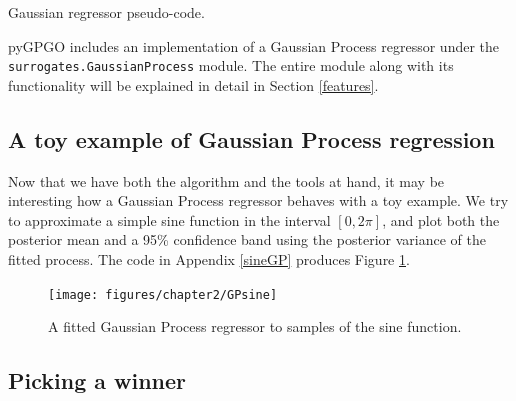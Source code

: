 \documentclass[10pt,a4paper,twoside]{book}
\begin{document}
\begin{algorithm}
	\caption{Gaussian regressor pseudo-code.}
		\label{alg}
		\begin{algorithmic}[1]
			\EndFunction
		\end{algorithmic}
\end{algorithm}

pyGPGO includes an implementation of a Gaussian Process regressor under the \texttt{surrogates.GaussianProcess} module. The entire module along with its functionality will be explained in detail in Section \ref{features}.

\subsection{A toy example of Gaussian Process regression}

Now that we have both the algorithm and the tools at hand, it may be interesting how a Gaussian Process regressor behaves with a toy example. We try to approximate a simple sine function in the interval $[0, 2\pi]$, and plot both the posterior mean and a 95\% confidence band using the posterior variance of the fitted process. The code in Appendix \ref{sineGP} produces Figure \ref{fig:GPsine}.\\


\begin{figure}
\caption{A fitted Gaussian Process regressor to samples of the sine function.}
\label{fig:GPsine}
\texttt{[image: figures/chapter2/GPsine]}
\end{figure}

\subsection{Picking a winner}
\end{document}
